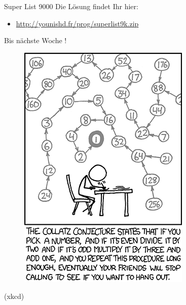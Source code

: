 \documentclass[18pt]{beamer}
\begin{document}
\begin{frame}{Super List 9000}
    Die Lösung findet Ihr hier:
    \begin{itemize}
        \item \url{http://younishd.fr/prog/superlist9k.zip}
    \end{itemize}
\end{frame}

\appendix
\beginbackup

\begin{frame}{Bis nächste Woche !}
    \begin{figure}
        \includegraphics[scale=.5]{img/collatz_conjecture.png}
    \end{figure}
    (xkcd)
\end{frame}

\backupend
\end{document}
